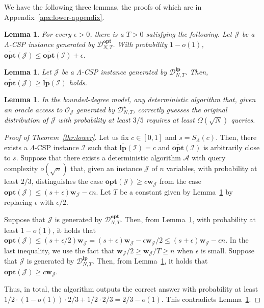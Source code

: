 \documentclass[letterpaper, 11pt]{article}
\newtheorem{lemma}[theorem]{Lemma}
\newcommand{\calA}{\mathcal{A}}
\newcommand{\calD}{\mathcal{D}}
\newcommand{\calI}{\mathcal{I}}
\newcommand{\calJ}{\mathcal{J}}
\newcommand{\calO}{\mathcal{O}}
\newcommand{\biw}{\boldsymbol{w}}
\newcommand{\lp}{\mathbf{lp}}
\newcommand{\opt}{\mathbf{opt}}
\newcommand{\olopt}{\overline{\mathbf{opt}}}
\newcommand{\ollp}{\overline{\mathbf{lp}}}
\begin{document}
We have the following three lemmas, 
the proofs of which are in Appendix~\ref{apx:lower-appendix}.
\begin{lemma}\label{lmm:less-than-opt}
  For every $\epsilon>0$, there is a $T>0$ satisfying the following.
  Let $\calJ$ be a $\Lambda$-CSP instance generated by $\calD_{N,T}^{\opt}$.
  With probability $1-o(1)$,
  $\olopt(\calJ) \leq \olopt(\calI)+\epsilon$.
\end{lemma}
\begin{lemma}\label{lmm:more-than-lp}
  Let $\calJ$ be a $\Lambda$-CSP instance generated by $\calD_{N,T}^{\lp}$.
  Then, $\olopt(\calJ) \geq \ollp(\calI)$ holds.
\end{lemma}
\begin{lemma}\label{lmm:distinguish}
  In the bounded-degree model,
  any deterministic algorithm that,
  given an oracle access to $\calO_{\calJ}$ generated by $\calD_{N,T}^\star$,
  correctly guesses the original distribution of $\calJ$ with probability at least $3/5$ requires at least $\Omega(\sqrt{N})$ queries.
\end{lemma}

\begin{proof}[Proof of Theorem~\ref{thr:lower}]
  Let us fix $c\in [0,1]$ and $s=S_{\Lambda}(c)$.
  Then, there exists a $\Lambda$-CSP instance $\calI$ such that $\ollp(\calI)=c$ and $\olopt(\calI)$ is arbitrarily close to $s$.
  Suppose that there exists a deterministic algorithm $\calA$ with query complexity $o(\sqrt{n})$ that, 
  given an instance $\calJ$ of $n$ variables,
  with probability at least $2/3$,
  distinguishes the case $\opt(\calJ) \geq c\biw_{\calJ}$ from the case $\opt(\calJ) \leq (s+\epsilon)\biw_{\calJ}-\epsilon n$.
  Let $T$ be a constant given by Lemma~\ref{lmm:less-than-opt} by replacing $\epsilon$ with $\epsilon/2$.

  Suppose that $\calJ$ is generated by $\calD_{N,T}^{\opt}$.
  Then, from Lemma~\ref{lmm:less-than-opt}, 
  with probability at least $1-o(1)$, 
  it holds that $\opt(\calJ) \leq (s+\epsilon/2)\biw_{\calJ} = (s+\epsilon)\biw_{\calJ}-\epsilon \biw_{\calJ}/2 \leq (s+\epsilon)\biw_{\calJ} - \epsilon n$.
  In the last inequality, we use the fact that $\biw_{\calJ}/2 \geq \biw_{\calJ}/T \geq n$ when $\epsilon$ is small.
  Suppose that $\calJ$ is generated by $\calD_{N,T}^{\lp}$.
  Then, from Lemma~\ref{lmm:more-than-lp},
  it holds that $\opt(\calJ) \geq c\biw_{\calJ}$.

  Thus, in total, the algorithm outputs the correct answer with probability at least
  \( 1/2 \cdot (1-o(1)) \cdot 2/3 + 1/2\cdot 2/3 = 2/3-o(1) \).
  This contradicts Lemma~\ref{lmm:distinguish}.
\end{proof}
\end{document}
